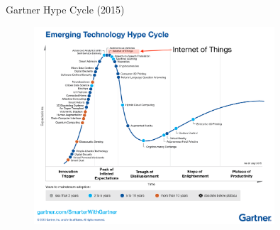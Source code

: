 \begin{frame}{Gartner Hype Cycle (2015)}
  \begin{figure}
    \includegraphics[width=0.8\textwidth]{figures/hype.png}
  \end{figure}
\end{frame}

